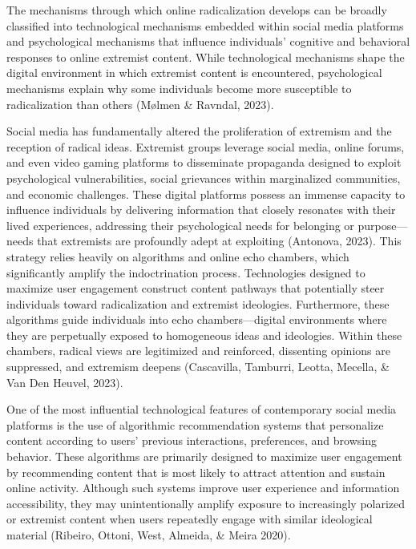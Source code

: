 \documentclass[10pt]{NSP1}
\begin{document}
The mechanisms through which online radicalization develops can be broadly classified into technological mechanisms embedded within social media platforms and psychological mechanisms that influence individuals' cognitive and behavioral responses to online extremist content. While technological mechanisms shape the digital environment in which extremist content is encountered, psychological mechanisms explain why some individuals become more susceptible to radicalization than others (Mølmen \& Ravndal, 2023).

\par\medskip{}\smallskip

Social media has fundamentally altered the proliferation of extremism and the reception of radical ideas. Extremist groups leverage social media, online forums, and even video gaming platforms to disseminate propaganda designed to exploit psychological vulnerabilities, social grievances within marginalized communities, and economic challenges. These digital platforms possess an immense capacity to influence individuals by delivering information that closely resonates with their lived experiences, addressing their psychological needs for belonging or purpose—needs that extremists are profoundly adept at exploiting (Antonova, 2023). This strategy relies heavily on algorithms and online echo chambers, which significantly amplify the indoctrination process. Technologies designed to maximize user engagement construct content pathways that potentially steer individuals toward radicalization and extremist ideologies. Furthermore, these algorithms guide individuals into echo chambers—digital environments where they are perpetually exposed to homogeneous ideas and ideologies. Within these chambers, radical views are legitimized and reinforced, dissenting opinions are suppressed, and extremism deepens (Cascavilla, Tamburri, Leotta, Mecella, \& Van Den Heuvel, 2023).

\par\medskip{}\smallskip

One of the most influential technological features of contemporary social media platforms is the use of algorithmic recommendation systems that personalize content according to users' previous interactions, preferences, and browsing behavior. These algorithms are primarily designed to maximize user engagement by recommending content that is most likely to attract attention and sustain online activity. Although such systems improve user experience and information accessibility, they may unintentionally amplify exposure to increasingly polarized or extremist content when users repeatedly engage with similar ideological material (Ribeiro, Ottoni, West, Almeida, \& Meira 2020).
\end{document}
